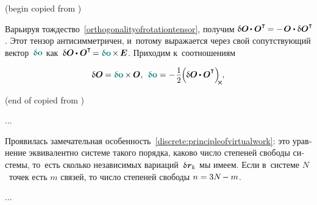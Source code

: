 \begin{otherlanguage}{russian}
(begin copied from )

Варьируя тождество~\eqref{orthogonalityofrotationtensor}, получим ${\variation{\rotationtensor} \hspace{-0.2ex} \dotp \rotationtensor^{\T} \hspace{-0.2ex} = - \hspace{.2ex} \rotationtensor \dotp \variation{\rotationtensor}^{\T}\!}$.
Этот тензор антисимметричен, и~потому выражается через свой сопутствующий вектор~${\varvector{o}}$ как~${\variation{\rotationtensor} \hspace{-0.1ex} \dotp \rotationtensor^{\T} \hspace{-0.3ex} = \varvector{o} \hspace{-0.2ex} \times \hspace{-0.2ex} \UnitDyad}$.
Приходим к~соотношениям

\nopagebreak\vspace{-0.5em}\begin{equation}
\variation{\rotationtensor} \hspace{-0.1ex} = \varvector{o} \hspace{-0.1ex} \times \hspace{-0.1ex} \rotationtensor , \:\:
\varvector{o} = - \hspace{.2ex} \scalebox{.93}{$ \displaystyle\onehalf $} \hspace{-0.1ex} \Bigl( \hspace{-0.1ex} \variation{\rotationtensor} \hspace{-0.1ex} \dotp \rotationtensor^{\T} \Bigr)_{\hspace{-0.25em}\Xcompanion}
\hspace{-0.1ex} ,
\end{equation}

(end of copied from )

...


Проявилась замечательная особенность~\eqref{discrete:principleofvirtualwork}: это уравнение эквивалентно системе такого порядка, каково число степеней свободы системы, то~есть сколько независимых вариаций~${\variation{\hspace{.1ex}\locationvector_k}}$ мы имеем.
Если в~системе $N$~точек есть $m$ связей, то число степеней свободы ${n = 3N \hspace{-0.25ex} - m}$.

...



\end{otherlanguage}
